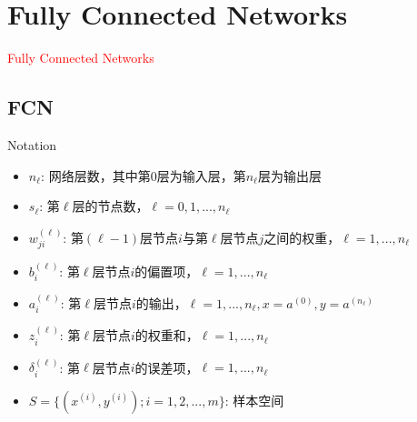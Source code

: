\section{Fully Connected Networks}
\label{sec:fcn}

\begin{frame}
  \begin{center}
    \Huge{\textcolor{red}{Fully Connected Networks}}
  \end{center}
\end{frame}

\subsection{FCN}

\begin{frame}{Notation}
 \begin{itemize}
   \item \alert{$ {n_{\ell}} $}: 网络层数，其中第$0$层为输入层，第$n_{\ell}$层为输出层
   \item \alert{$ {s_{\ell}} $}: 第$\ell$层的节点数，$ \ell = 0, 1, ..., n_{\ell} $
   \item \alert{$ w_{ji}^{(\ell)} $}: 第$(\ell-1)$层节点$i$与第$\ell$层节点$j$之间的权重，$ \ell = 1, ..., n_{\ell} $
   \item \alert{$ b_i^{(\ell)} $}: 第$\ell$层节点$i$的偏置项，$ \ell = 1, ..., n_{\ell} $
   \item \alert{$ a_i^{(\ell)} $}: 第$\ell$层节点$i$的输出，$ \ell = 1, ..., n_{\ell}, x = a^{(0)}, y = a^{(n_{\ell})} $
   \item \alert{$ z_i^{(\ell)} $}: 第$\ell$层节点$i$的权重和，$ \ell = 1, ..., n_{\ell} $
   \item \alert{$ \delta _i^{(\ell)} $}: 第$\ell$层节点$i$的误差项，$ \ell = 1, ..., n_{\ell} $
   \item \alert{$ S = \{ ({x^{(i)}},{y^{(i)}});i = 1,2,...,m\} $}: 样本空间
 \end{itemize}
\end{frame}

